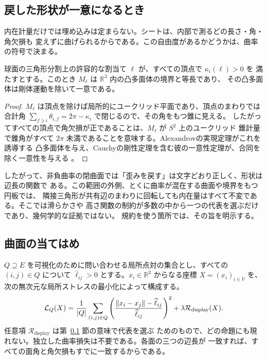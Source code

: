 \subsection{戻した形状が一意になるとき}
\label{sec:rigidity}

内在計量だけでは埋め込みは定まらない。シートは、内部で測るどの長さ・角・角欠損も
変えずに曲げられるからである。この自由度があるかどうかは、曲率の符号で決まる。

\begin{proposition}[剛な場合]
\label{prop:rigidity}
球面の三角形分割上の許容的な割当て $\ell$ が、すべての頂点で $\kappa_i(\ell)>0$ を
満たすとする。このとき $M_\ell$ は $\mathbb R^3$ 内の凸多面体の境界と等長であり、
その凸多面体は剛体運動を除いて一意である。
\end{proposition}

\begin{proof}
$M_\ell$ は頂点を除けば局所的にユークリッド平面であり、頂点のまわりでは合計角
$\sum_{f\ni i}\theta_{i,f}=2\pi-\kappa_i$ で閉じるので、その角をもつ錐に見える。
したがってすべての頂点で角欠損が正であることは、$M_\ell$ が $S^2$ 上のユークリッド
錐計量で錐角がすべて $2\pi$ 未満であることを意味する。Alexandrovの実現定理がこれを誘導する
凸多面体を与え、Cauchyの剛性定理を含む彼の一意性定理が、合同を除く一意性を与える
\cite{alexandrov2005,pak2010}。
\end{proof}

したがって、非負曲率の閉曲面では「歪みを戻す」は文字どおり正しく、形状は辺長の関数で
ある。この範囲の外側、とくに曲率が混在する曲面や境界をもつ円板では、
隣接三角形が共有辺のまわりに回転しても内在量はすべて不変である。そこでは滑らかさや
高さ関数の制約が多数の中から一つの代表を選ぶだけであり、幾何学的な証拠ではない。
規約を使う箇所では、その旨を明示する。

\subsection{曲面の当てはめ}

$Q\supseteq E$ を可視化のために問い合わせる局所点対の集合とし、すべての
$(i,j)\in Q$ について $\widehat\ell_{ij}>0$ とする。$x_i\in\mathbb R^3$ からなる座標
$X=(x_i)_{i\in V}$ を、次の無次元な局所ストレスの最小化によって構成する。
\begin{equation}
 \mathcal L_Q(X)
 =\frac1{|Q|}\sum_{(i,j)\in Q}
 \left(
  \frac{\lVert x_i-x_j\rVert-\widehat\ell_{ij}}
  {\widehat\ell_{ij}}
 \right)^2
 +\lambda\mathcal R_{\mathrm{display}}(X).
 \label{eq:display-objective}
\end{equation}
任意項 $\mathcal R_{\mathrm{display}}$ は第~\ref{sec:rigidity} 節の意味で代表を選ぶ
ためのもので、どの命題にも現れない。独立した曲率損失は不要である。各面の三つの辺長が
一致すれば、すべての面角と角欠損もすでに一致するからである。

